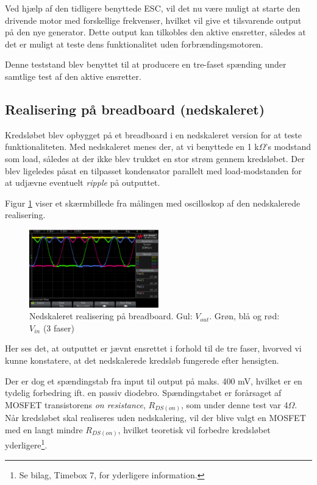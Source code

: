 Ved hjælp af den tidligere benyttede ESC, vil det nu være muligt at starte den drivende motor med forskellige frekvenser, hvilket vil give et tilsvarende output på den nye generator. Dette output kan tilkobles den aktive ensretter, således at det er muligt at teste dens funktionalitet uden forbrændingsmotoren. 

Denne teststand blev benyttet til at producere en tre-faset spænding under samtlige test af den aktive ensretter.

\subsection{Realisering på breadboard (nedskaleret)}
\label{sec:real-pa-breadb}

Kredsløbet blev opbygget på et breadboard i en nedskaleret version for at teste funktionaliteten. Med nedskaleret menes der, at vi benyttede en 1 k$\Omega$’s modstand som load, således at der ikke blev trukket en stor strøm gennem kredsløbet. Der blev ligeledes påsat en tilpasset kondensator parallelt med load-modstanden for at udjævne eventuelt \textit{ripple} på outputtet. 

Figur \ref{fig:prens7} viser et skærmbillede fra målingen med oscilloskop af den nedskalerede realisering.

\begin{figure}[h]
  \centering
  \includegraphics[width=0.5\textwidth]{./figurer/prens7.png}
  \caption{Nedskaleret realisering på breadboard. Gul: $V_{out}$. Grøn, blå og rød: $V_{in}$ (3 faser)}
  \label{fig:prens7}
\end{figure}

Her ses det, at outputtet er jævnt ensrettet i forhold til de tre faser, hvorved vi kunne konstatere, at det nedskalerede kredsløb fungerede efter hensigten.

Der er dog et spændingstab fra input til output på maks. 400 mV, hvilket er en tydelig forbedring ift. en passiv diodebro. Spændingstabet er forårsaget af MOSFET transistorens \textit{on resistance}, $R_{DS(on)}$, som under denne test var 4$\Omega$. Når kredsløbet skal realiseres uden nedskalering, vil der blive valgt en MOSFET med en langt mindre $R_{DS(on)}$, hvilket teoretisk vil forbedre kredsløbet yderligere\footnote{Se bilag, Timebox 7, for yderligere information.}.  



